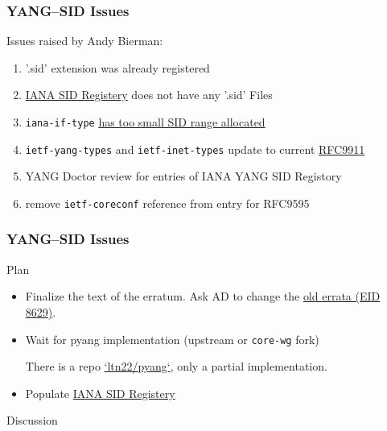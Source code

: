 \documentclass{beamer}
\begin{document}
\begin{frame}[fragile]
	\frametitle{YANG--SID Issues}
	
	Issues raised by Andy Bierman:
	\begin{enumerate}
		\item '.sid' extension was already registered
		\item \href{https://www.iana.org/assignments/yang-sid/yang-sid.xhtml#ietf-yang-sid-modules}{IANA SID Registery} does not have any '.sid' Files
		\item \verb|iana-if-type| \href{https://mailarchive.ietf.org/arch/msg/yang-tooling/Sr-AMBFO-WBoHcIog7iaMDqS2I4/}{has too small SID range allocated}
		\item \verb|ietf-yang-types| and \verb|ietf-inet-types| update to current \href{https://datatracker.ietf.org/doc/html/rfc9911}{RFC9911}
		\item YANG Doctor review for entries of IANA YANG SID Registory
		\item remove \verb|ietf-coreconf| reference from entry for RFC9595
	\end{enumerate}

\end{frame}


\begin{frame}[fragile]
	\frametitle{YANG--SID Issues}
	
	\begin{block}{Plan}
	
		\begin{itemize}
			\item Finalize the text of the erratum. Ask AD to change the \href{https://www.rfc-editor.org/errata/eid8629}{old errata (EID 8629)}.
			\item Wait for pyang implementation (upstream or \verb|core-wg| fork)
			
			There is a repo \href{https://github.com/ltn22/pyang}{`ltn22/pyang`}, only a partial implementation.
			\item Populate \href{https://www.iana.org/assignments/yang-sid/yang-sid.xhtml#ietf-yang-sid-modules}{IANA SID Registery}
		\end{itemize}
	\end{block}
	
	\begin{block}{Discussion}
	\end{block}
	
\end{frame}
\end{document}
